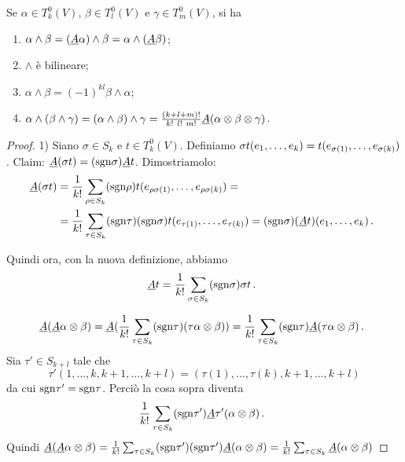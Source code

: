\begin{proposition}
	Se $\alpha \in T^0_k(V)$, $\beta \in T^0_l(V)$ e $\gamma \in T^0_m(V)$, si ha
	\begin{enumerate}
		\item $\alpha\wedge\beta = (\antisimm \alpha) \wedge \beta = \alpha\wedge (\antisimm \beta)$;
		\item $\wedge$ è bilineare;
		\item $\alpha\wedge \beta = (-1)^{kl} \beta \wedge \alpha$;
		\item $\alpha\wedge(\beta\wedge \gamma) = (\alpha\wedge\beta)\wedge\gamma = \frac{(k+l+m)!}{k!\ l!\ m!}\antisimm(\alpha\otimes\beta\otimes\gamma)$.
	\end{enumerate}
\end{proposition}
\begin{proof}
	1)
	Siano $\sigma \in S_k$ e $t\in T^0_k(V)$. Definiamo $\sigma t(\seqb{e}{k}{,}) = t(e_{\sigma(1)}, \ldots, e_{\sigma(k)})$.
	Claim: $\antisimm (\sigma t) = (\sgn \sigma) \antisimm t$.
	Dimostriamolo:
	\begin{align*}
		\antisimm (\sigma t) &= \frac 1{k!} \sum_{\rho \in S_k} (\sgn \rho) t(e_{\rho\sigma (1)},\ldots,e_{\rho\sigma(k)}) =\\
		&= \frac 1{k!} \sum_{\tau\in S_k} (\sgn\tau)(\sgn\sigma) t(e_{\tau(1)}, \ldots, e_{\tau(k)}) = (\sgn\sigma) (\antisimm t)(\seqb{e}{k}{,})\punto
	\end{align*}
	
	Quindi ora, con la nuova definizione, abbiamo
	\begin{equation*}
		\antisimm t = \frac 1{k!} \sum_{\sigma\in S_k} (\sgn\sigma) \sigma t \punto
	\end{equation*}

	\begin{equation*}
		\antisimm(\antisimm \alpha \otimes \beta) = \antisimm(\frac 1{k!} \sum_{\tau\in S_k} (\sgn\tau) (\tau\alpha \otimes \beta)) =
		\frac 1{k!} \sum_{\tau\in S_k}(\sgn\tau) \antisimm(\tau\alpha\otimes \beta)\punto
	\end{equation*}
	Sia $\tau'\in S_{k+l}$ tale che
	\begin{equation*}
		\tau'(1,\ldots,k,k+1,\ldots,k+l) = (\tau(1),\ldots,\tau(k),k+1,\ldots,k+l)
	\end{equation*}
	da cui $\sgn\tau'=\sgn\tau$.
	Perciò la cosa sopra diventa
	\begin{equation*}
		\frac 1{k!} \sum_{\tau\in S_k} (\sgn\tau')\antisimm\tau'(\alpha\otimes \beta)\punto
	\end{equation*}
	Quindi $\antisimm(\antisimm\alpha\otimes \beta) = \frac 1{k!} \sum_{\tau\in S_k} (\sgn\tau')(\sgn\tau')\antisimm(\alpha\otimes \beta)=\frac 1{k!} \sum_{\tau\in S_k} \antisimm(\alpha\otimes \beta)$


\end{proof}
